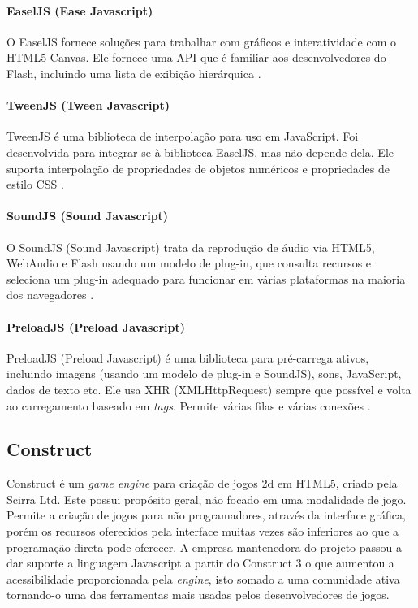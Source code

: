 \paragraph{ EaselJS (Ease Javascript) }
O EaselJS fornece soluções para trabalhar com
gráficos e interatividade com o HTML5 Canvas. Ele fornece uma API que é familiar aos
desenvolvedores do Flash, incluindo uma lista de
exibição hierárquica \cite{manderscheid2014beginning}.

\paragraph{ TweenJS (Tween Javascript) }
TweenJS é uma biblioteca de interpolação para uso
em JavaScript. Foi desenvolvida para integrar-se
à biblioteca EaselJS, mas não depende dela. Ele
suporta interpolação de propriedades de objetos
numéricos e propriedades de estilo CSS \cite{manderscheid2014beginning}.

\paragraph{ SoundJS (Sound Javascript) }
O SoundJS (Sound Javascript) trata da reprodução de áudio via HTML5, WebAudio e Flash usando um modelo de plug-in, que consulta recursos e seleciona um plug-in adequado para funcionar em várias plataformas na maioria dos navegadores \cite{manderscheid2014beginning}.

\paragraph{ PreloadJS (Preload Javascript) }
PreloadJS (Preload Javascript) é uma biblioteca para pré-carrega ativos, incluindo imagens  (usando um modelo de plug-in e SoundJS), sons, JavaScript, dados de texto etc. Ele usa XHR (XMLHttpRequest) sempre que possível e volta ao carregamento baseado em \textit{tags}. Permite várias filas e várias conexões \cite{manderscheid2014beginning}.

\subsection{Construct}

Construct é um \textit{game engine} para criação de jogos 2d em HTML5, criado pela Scirra Ltd. Este possui propósito geral, não focado em uma modalidade de jogo. Permite a criação de jogos para não programadores, através da interface gráfica, porém os recursos oferecidos pela interface muitas vezes são inferiores ao que a programação direta pode oferecer. A empresa mantenedora do projeto passou a dar suporte a linguagem Javascript a partir do Construct 3 o que aumentou a acessibilidade proporcionada pela \textit{engine}, isto somado a uma comunidade ativa tornando-o uma das ferramentas mais usadas pelos desenvolvedores de jogos.

